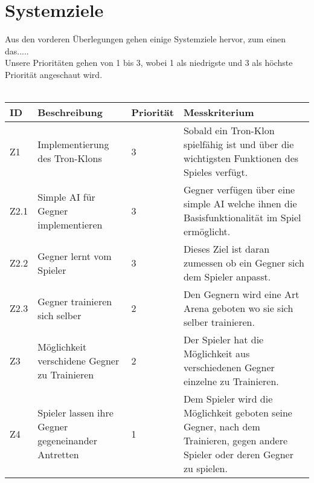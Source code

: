 \section{Systemziele}

Aus den vorderen Überlegungen gehen einige Systemziele hervor, zum einen das..... %
\\ 
Unsere Prioritäten gehen von 1 bis 3, wobei 1 als niedrigste und 3 als höchste Priorität angeschaut wird.
\\\\
\begin{tabularx}{\textwidth}{| p{0.3cm} | X | p{1.5cm} | X |}
\hline
\rowcolor[gray]{0.9} ID & Beschreibung & Priorität & Messkriterium\\
\hline
Z1 & Implementierung des Tron-Klons & 3 & Sobald ein Tron-Klon spielfähig ist und über die wichtigsten Funktionen des Spieles verfügt.\\
\hline
Z2.1 & Simple AI für Gegner implementieren & 3 & Gegner verfügen über eine simple AI welche ihnen die Basisfunktionalität im Spiel ermöglicht. \\
\hline
Z2.2 & Gegner lernt vom Spieler & 3 & Dieses Ziel ist daran zumessen ob ein Gegner sich dem Spieler anpasst. \\
\hline 
Z2.3 & Gegner trainieren sich selber & 2 & Den Gegnern wird eine Art Arena geboten wo sie sich selber trainieren. \\
\hline
Z3 & Möglichkeit verschidene Gegner zu Trainieren & 2 & Der Spieler hat die Möglichkeit aus verschiedenen Gegner einzelne zu Trainieren. \\
\hline
Z4 & Spieler lassen ihre Gegner gegeneinander Antretten & 1 & Dem Spieler wird die Möglichkeit geboten seine Gegner, nach dem Trainieren, gegen andere Spieler oder deren Gegner zu spielen. \\
\hline
\end{tabularx}
